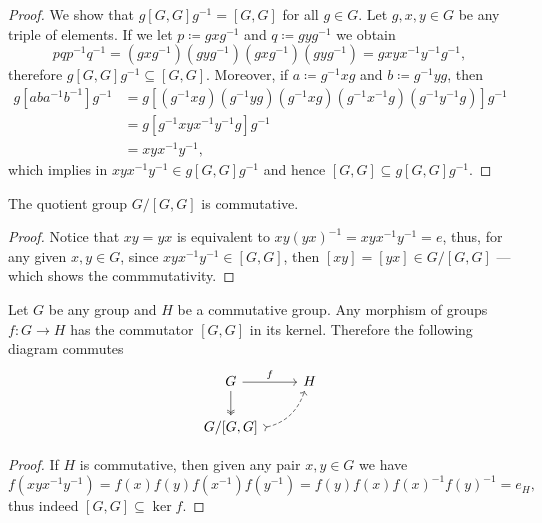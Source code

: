 \begin{proof}
We show that \(g [G, G] g^{-1} = [G, G]\) for all \(g \in G\). Let \(g, x, y \in
G\) be any triple of elements. If we let \(p \coloneq g x g^{-1}\) and \(q
\coloneq g y g^{-1}\) we obtain
\[
p q p^{-1} q ^{-1}
= (g x g^{-1}) (g y g^{-1}) (g x g^{-1}) (g y g^{-1})
= g x y x^{-1} y^{-1} g^{-1},
\]
therefore \(g [G, G] g^{-1} \subseteq [G, G]\). Moreover, if \(a \coloneq g^{-1}
x g\) and \(b \coloneq g^{-1} y g\), then
\begin{align*}
g [a b a^{-1} b^{-1}] g^{-1}
&= g [
    (g^{-1} x g) (g^{-1} y g) (g^{-1} x g)
    (g^{-1} x^{-1} g) (g^{-1} y^{-1} g)
  ] g^{-1} \\
&= g [ g^{-1} x y x^{-1} y^{-1} g] g^{-1} \\
&= x y x^{-1} y^{-1},
\end{align*}
which implies in \(x y x^{-1} y^{-1} \in g [G, G] g^{-1}\) and hence \([G, G]
\subseteq g [G, G] g^{-1}\).
\end{proof}

\begin{lemma}
\label{lem:grp-modulo-commutator-is-commutative}
The quotient group \(G/[G, G]\) is commutative.
\end{lemma}

\begin{proof}
Notice that \(x y = y x\) is equivalent to \(x y (y x)^{-1} = x y x^{-1} y^{-1}
= e\), thus, for any given \(x, y \in G\), since \(x y x^{-1} y^{-1} \in [G,
G]\), then \([x y] = [y x] \in G/[G, G]\) --- which shows the commmutativity.
\end{proof}

\begin{lemma}
\label{lem:commutator-kernel}
Let \(G\) be any group and \(H\) be a commutative group. Any morphism of groups
\(f: G \to H\) has the commutator \([G, G]\) in its kernel. Therefore the
following diagram commutes
\[
\begin{tikzcd}
G \ar[r, "f"] \ar[d, two heads]            & H \\
G/[G, G] \ar[ru, bend right, dashed, tail] &
\end{tikzcd}
\]
\end{lemma}

\begin{proof}
If \(H\) is commutative, then given any pair \(x, y \in G\) we have
\[
f(x y x^{-1} y^{-1})
= f(x) f(y) f(x^{-1}) f(y^{-1})
= f(y) f(x) f(x)^{-1} f(y)^{-1}
= e_H,
\]
thus indeed \([G, G] \subseteq \ker f\).
\end{proof}


